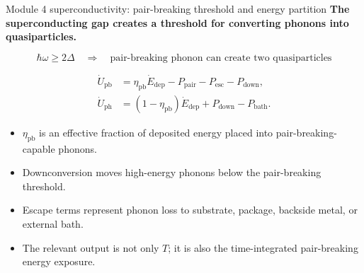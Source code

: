 \documentclass[aspectratio=169,10pt]{beamer}
\begin{document}
\begin{frame}{Module 4 superconductivity: pair-breaking threshold and energy partition}
\footnotesize
\textbf{The superconducting gap creates a threshold for converting phonons into quasiparticles.}

\vspace{-0.1em}
\begin{equation*}
\boxed{
\hbar\omega\geq 2\Delta
\quad\Rightarrow\quad
\text{pair-breaking phonon can create two quasiparticles}
}
\end{equation*}

\vspace{-0.15em}
\begin{align*}
\dot U_{\mathrm{pb}}&=\eta_{\mathrm{pb}}\dot E_{\mathrm{dep}}-P_{\mathrm{pair}}-P_{\mathrm{esc}}-P_{\mathrm{down}},\\[-0.05em]
\dot U_{\mathrm{ph}}&=(1-\eta_{\mathrm{pb}})\dot E_{\mathrm{dep}}+P_{\mathrm{down}}-P_{\mathrm{bath}}.
\end{align*}

\vspace{-0.2em}
\begin{itemize}
    \item $\eta_{\mathrm{pb}}$ is an effective fraction of deposited energy placed into pair-breaking-capable phonons.
    \item Downconversion moves high-energy phonons below the pair-breaking threshold.
    \item Escape terms represent phonon loss to substrate, package, backside metal, or external bath.
    \item The relevant output is not only $T$; it is also the time-integrated pair-breaking energy exposure.
\end{itemize}
\end{frame}
\end{document}
